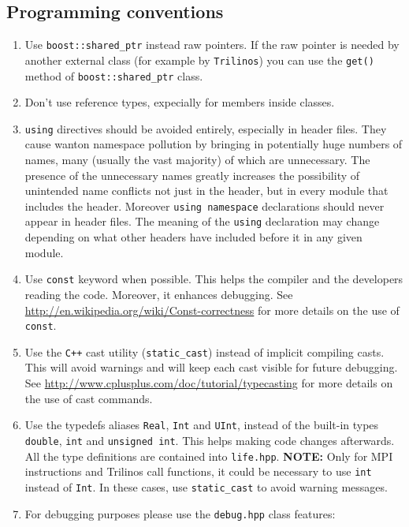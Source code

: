 \documentclass[a4paper]{article}
\begin{document}
\subsection{Programming conventions}
\begin{enumerate}
  \item Use \texttt{boost::shared\_ptr} instead raw pointers. If the raw pointer is needed by another external class (for example by \texttt{Trilinos}) you can use the \texttt{get()} method of \texttt{boost::shared\_ptr} class.
  \item Don't use reference types, expecially for members inside classes.
  \item \texttt{using} directives should be avoided entirely, especially in header files. They cause wanton namespace pollution by bringing in potentially huge numbers of names, many (usually the vast majority) of which are unnecessary. The presence of the unnecessary names greatly increases the possibility of unintended name conflicts not just in the header, but in every module that includes the header. Moreover
  \texttt{using namespace} declarations should never appear in header files. The meaning of the \texttt{using} declaration may change depending on what other headers have included before it in any given module.
  \item Use \texttt{const} keyword when possible. This helps the compiler and the developers reading the code. Moreover, it enhances debugging. See \url{http://en.wikipedia.org/wiki/Const-correctness} for more details on the use of \texttt{const}.
  \item Use the \texttt{C++} cast utility (\texttt{static\_cast}) instead of implicit compiling casts. This will avoid warnings and will keep each cast visible for future debugging. See
  \url{http://www.cplusplus.com/doc/tutorial/typecasting} for more details on the use of cast commands.
  \item Use the typedefs aliases \texttt{Real}, \texttt{Int} and \texttt{UInt}, instead of the built-in types \texttt{double}, \texttt{int} and \texttt{unsigned int}. This helps making code changes afterwards. All the type definitions are contained into \texttt{life.hpp}. \newline \textbf{NOTE:} Only for MPI instructions and Trilinos call functions, it could be necessary to use \texttt{int} instead of \texttt{Int}. In these cases, use \texttt{static\_cast} to avoid warning messages.
  \item For debugging purposes please use the \texttt{debug.hpp} class features:

\end{enumerate}
\end{document}
